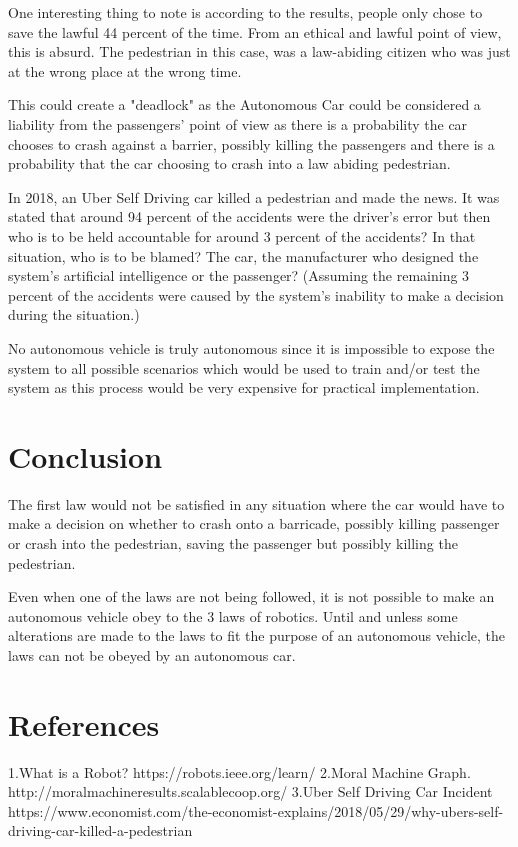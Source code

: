 \documentclass{article}
\begin{document}
One interesting thing to note is according to the results, people only chose to save the lawful 44 percent of the time. From an ethical and lawful point of view, this is absurd. The pedestrian in this case, was a law-abiding citizen who was just at the wrong place at the wrong time. 

This could create a "deadlock" as the Autonomous Car could be considered a liability from the passengers' point of view as there is a probability the car chooses to crash against a barrier, possibly killing the passengers and there is a probability that the car choosing to crash into a law abiding pedestrian. 


In 2018, an Uber Self Driving car killed a pedestrian and made the news. It was stated that around 94 percent of the accidents were the driver's error but then who is to be held accountable for around 3 percent of the accidents? In that situation, who is to be blamed? The car, the manufacturer who designed the system's artificial intelligence or the passenger? (Assuming the remaining 3 percent of the accidents were caused by the system's inability to make a decision during the situation.)

No autonomous vehicle is truly autonomous since it is impossible to expose the system to all possible scenarios which would be used to train and/or test the system as this process would be very expensive for practical implementation.

\section{Conclusion}
The first law would not be satisfied in any situation where the car would have to make a decision on whether to crash onto a barricade, possibly killing passenger or crash into the pedestrian, saving the passenger but possibly killing the pedestrian.

Even when one of the laws are not being followed, it is not possible to make an autonomous vehicle obey to the 3 laws of robotics. Until and unless some alterations are made to the laws to fit the purpose of an autonomous vehicle, the laws can not be obeyed by an autonomous car.
\section{References}
1.What is a Robot? https://robots.ieee.org/learn/
2.Moral Machine Graph. http://moralmachineresults.scalablecoop.org/
3.Uber Self Driving Car Incident https://www.economist.com/the-economist-explains/2018/05/29/why-ubers-self-driving-car-killed-a-pedestrian

    
\end{document}

